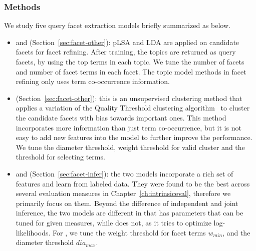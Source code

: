 \subsubsection{Methods}
We study five query facet extraction models briefly summarized as below.
\begin{itemize}
\item \PLSA and \LDA (Section~\ref{sec:facet-other}): pLSA and LDA are applied on candidate facets for facet refining. %
After training, the topics are returned as query facets, by using the top terms in each topic. We tune the number of facets and number of facet terms in each facet. The topic model methods in facet refining only uses term co-occurrence information.
\item \QDM (Section~\ref{sec:facet-other}): this is an unsupervised clustering method that applies a variation of the Quality Threshold clustering algorithm~\cite{heyer1999exploring} to cluster the candidate facets with bias towards important ones. 
This method incorporates more information than just term co-occurrence, but it is not easy to add new features into the model to further improve the performance.
We tune the diameter threshold, weight threshold for valid cluster and the threshold for selecting terms.
\item \QFI and \QFJ (Section~\ref{sec:facet-infer}): the two models incorporate a rich set of features and learn from labeled data. They were found to be the best across several evaluation measures in Chapter~\ref{ch:intrinsiceval}, therefore we primarily focus on them. Beyond the difference of independent and joint inference, the two models are different in that \QFI has parameters that can be tuned for given measures, while \QFJ does not, as it tries to optimize log-likelihoods. For \QFI, we tune the weight threshold for facet terms $w_{min}$, and the diameter threshold $dia_{max}$.
\end{itemize}


